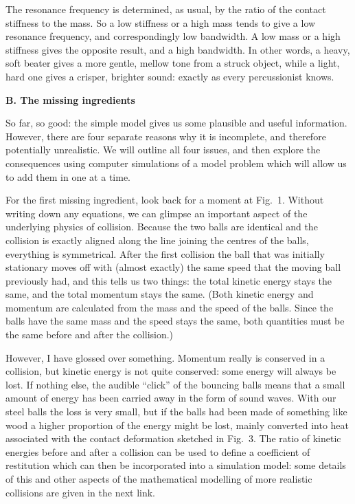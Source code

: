 
  The resonance frequency is determined, as usual, by the ratio of the contact 
  stiffness to the mass. So a low stiffness or a high mass tends to give a low 
  resonance frequency, and correspondingly low bandwidth. A low mass or a high 
  stiffness gives the opposite result, and a high bandwidth. In other words, a 
  heavy, soft beater gives a more gentle, mellow tone from a struck object, 
  while a light, hard one gives a crisper, brighter sound: exactly as every 
  percussionist knows. 

  \textbf{B. The missing ingredients} 

  So far, so good: the simple model gives us some plausible and useful 
  information. However, there are four separate reasons why it is incomplete, 
  and therefore potentially unrealistic. We will outline all four issues, and 
  then explore the consequences using computer simulations of a model problem 
  which will allow us to add them in one at a time. 

  For the first missing ingredient, look back for a moment at Fig.\ 1. Without 
  writing down any equations, we can glimpse an important aspect of the 
  underlying physics of collision. Because the two balls are identical and the 
  collision is exactly aligned along the line joining the centres of the balls, 
  everything is symmetrical. After the first collision the ball that was 
  initially stationary moves off with (almost exactly) the same speed that the 
  moving ball previously had, and this tells us two things: the total kinetic 
  energy stays the same, and the total momentum stays the same. (Both kinetic 
  energy and momentum are calculated from the mass and the speed of the balls. 
  Since the balls have the same mass and the speed stays the same, both 
  quantities must be the same before and after the collision.) 

  However, I have glossed over something. Momentum really is conserved in a 
  collision, but kinetic energy is not quite conserved: some energy will always 
  be lost. If nothing else, the audible “click” of the bouncing balls means 
  that a small amount of energy has been carried away in the form of sound 
  waves. With our steel balls the loss is very small, but if the balls had been 
  made of something like wood a higher proportion of the energy might be lost, 
  mainly converted into heat associated with the contact deformation sketched 
  in Fig.\ 3. The ratio of kinetic energies before and after a collision can be 
  used to define a coefficient of restitution which can then be incorporated 
  into a simulation model: some details of this and other aspects of the 
  mathematical modelling of more realistic collisions are given in the next 
  link. 

